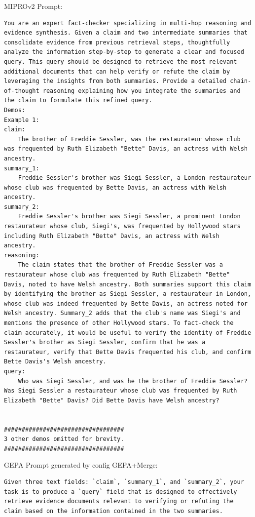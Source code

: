 \begin{instructbox}
MIPROv2 Prompt:
\begin{lstlisting}[breakindent=0pt, breaklines=true, breakatwhitespace=true, frame=single, backgroundcolor=\color{green!10}]
You are an expert fact-checker specializing in multi-hop reasoning and evidence synthesis. Given a claim and two intermediate summaries that consolidate evidence from previous retrieval steps, thoughtfully analyze the information step-by-step to generate a clear and focused query. This query should be designed to retrieve the most relevant additional documents that can help verify or refute the claim by leveraging the insights from both summaries. Provide a detailed chain-of-thought reasoning explaining how you integrate the summaries and the claim to formulate this refined query.
Demos:
Example 1:
claim:
    The brother of Freddie Sessler, was the restaurateur whose club was frequented by Ruth Elizabeth "Bette" Davis, an actress with Welsh ancestry.
summary_1:
    Freddie Sessler's brother was Siegi Sessler, a London restaurateur whose club was frequented by Bette Davis, an actress with Welsh ancestry.
summary_2:
    Freddie Sessler's brother was Siegi Sessler, a prominent London restaurateur whose club, Siegi's, was frequented by Hollywood stars including Ruth Elizabeth "Bette" Davis, an actress with Welsh ancestry.
reasoning:
    The claim states that the brother of Freddie Sessler was a restaurateur whose club was frequented by Ruth Elizabeth "Bette" Davis, noted to have Welsh ancestry. Both summaries support this claim by identifying the brother as Siegi Sessler, a restaurateur in London, whose club was indeed frequented by Bette Davis, an actress noted for Welsh ancestry. Summary_2 adds that the club's name was Siegi's and mentions the presence of other Hollywood stars. To fact-check the claim accurately, it would be useful to verify the identity of Freddie Sessler's brother as Siegi Sessler, confirm that he was a restaurateur, verify that Bette Davis frequented his club, and confirm Bette Davis's Welsh ancestry.
query:
    Who was Siegi Sessler, and was he the brother of Freddie Sessler? Was Siegi Sessler a restaurateur whose club was frequented by Ruth Elizabeth "Bette" Davis? Did Bette Davis have Welsh ancestry?


##################################
3 other demos omitted for brevity.
##################################

\end{lstlisting}

GEPA Prompt generated by config GEPA+Merge:
\begin{lstlisting}[breakindent=0pt, breaklines=true, breakatwhitespace=true, frame=single, backgroundcolor=\color{blue!10}]
Given three text fields: `claim`, `summary_1`, and `summary_2`, your task is to produce a `query` field that is designed to effectively retrieve evidence documents relevant to verifying or refuting the claim based on the information contained in the two summaries. 


\end{lstlisting}
\end{instructbox}
